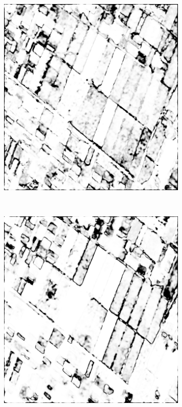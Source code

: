 \begin{figure}[tp]
\begin{subfigure}[b]{0.3\textwidth}
    	\caption{}
    	\label{fig:LPconf}
    	\end{subfigure}
     	~
   	 	\begin{subfigure}[b]{0.3\textwidth}
    	\includegraphics[width=\textwidth]{Figures/Kron/Conf/CP}
    	\caption{}
    	\label{fig:CPconf}
    	\end{subfigure}
            ~ %
            \begin{subfigure}[b]{0.3\textwidth}
                \includegraphics[width=\textwidth]{Figures/Kron/Conf/CLP}

\end{subfigure}
\end{figure}
